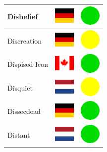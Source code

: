 \documentclass[12pt, a4paper, twoside]{report}
\begin{document}
\begin{center}
\begin{longtable}{|p{5cm}|p{2cm}|p{2cm}|}
Disbelief & \includegraphics[width=1cm]{4x3/de} & \includegraphics[width=1cm]{likes/y} \\ \hline
Discreation & \includegraphics[width=1cm]{4x3/de} & \includegraphics[width=1cm]{likes/m} \\ \hline
Dispised Icon & \includegraphics[width=1cm]{4x3/ca} & \includegraphics[width=1cm]{likes/y} \\ \hline
Disquiet & \includegraphics[width=1cm]{4x3/nl} & \includegraphics[width=1cm]{likes/m} \\ \hline
Dissecdead & \includegraphics[width=1cm]{4x3/de} & \includegraphics[width=1cm]{likes/y} \\ \hline
Distant & \includegraphics[width=1cm]{4x3/nl} & \includegraphics[width=1cm]{likes/y} \\ \hline

\end{longtable}
\end{center}
\end{document}
